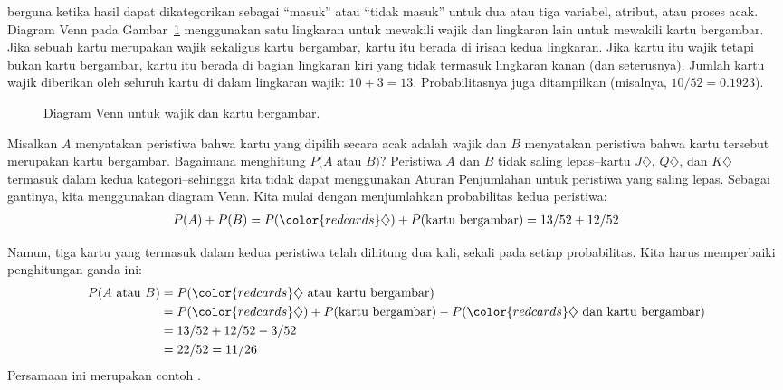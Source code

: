  berguna ketika hasil dapat dikategorikan sebagai “masuk” atau “tidak masuk” untuk dua atau tiga variabel, atribut, atau proses acak. Diagram Venn pada Gambar~\ref{cardsDiamondFaceVenn} menggunakan satu lingkaran untuk mewakili wajik dan lingkaran lain untuk mewakili kartu bergambar. Jika sebuah kartu merupakan wajik sekaligus kartu bergambar, kartu itu berada di irisan kedua lingkaran. Jika kartu itu wajik tetapi bukan kartu bergambar, kartu itu berada di bagian lingkaran kiri yang tidak termasuk lingkaran kanan (dan seterusnya). Jumlah kartu wajik diberikan oleh seluruh kartu di dalam lingkaran wajik: $10+3=13$. Probabilitasnya juga ditampilkan (misalnya, $10/52 = 0.1923$).

\begin{figure}[h]
\centering
{}
\caption{Diagram Venn untuk wajik dan kartu bergambar.}
\label{cardsDiamondFaceVenn}
\end{figure}

Misalkan $A$ menyatakan peristiwa bahwa kartu yang dipilih secara acak adalah wajik dan $B$ menyatakan peristiwa bahwa kartu tersebut merupakan kartu bergambar. Bagaimana menghitung $P(A$ atau $B)$? Peristiwa $A$ dan $B$ tidak saling lepas--kartu {\color{redcards}$J\diamondsuit$}, {\color{redcards}$Q\diamondsuit$}, dan {\color{redcards}$K\diamondsuit$} termasuk dalam kedua kategori--sehingga kita tidak dapat menggunakan Aturan Penjumlahan untuk peristiwa yang saling lepas. Sebagai gantinya, kita menggunakan diagram Venn. Kita mulai dengan menjumlahkan probabilitas kedua peristiwa:
\begin{align*}
P(A) + P(B)
  = P({\color{redcards}\diamondsuit}) + P(\text{kartu bergambar})
  = 13/52 + 12/52
\end{align*}

\D{\newpage}

\noindent%
Namun, tiga kartu yang termasuk dalam kedua peristiwa telah dihitung dua kali, sekali pada setiap probabilitas. Kita harus memperbaiki penghitungan ganda ini:
\begin{align*}
P(A\text{ atau } B)
  &= P({\color{redcards}\diamondsuit}\text{ atau kartu bergambar}) \\
  &= P({\color{redcards}\diamondsuit}) + P(\text{kartu bergambar})
      - P({\color{redcards}\diamondsuit}\text{ dan kartu bergambar}) \\
  &= 13/52 + 12/52 - 3/52 \\
  &= 22/52 = 11/26
\end{align*}
Persamaan ini merupakan contoh .

